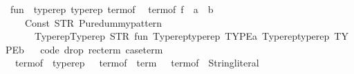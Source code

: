 \begin{isabellebody}
{\isafoldML}%
%
\isadelimML
%
\endisadelimML
%
\isadelimdocument
%
\endisadelimdocument
%
\isatagdocument
%
\isamarkuptrue%
%
\endisatagdocument
{\isafolddocument}%
%
\isadelimdocument
%
\endisadelimdocument
{}\isamarkupfalse%
\ {\isachardoublequoteopen}fun{\isachardoublequoteclose}\ {\isacharcolon}{\kern0pt}{\isacharcolon}{\kern0pt}\ {\isacharparenleft}{\kern0pt}typerep{\isacharcomma}{\kern0pt}\ typerep{\isacharparenright}{\kern0pt}\ term{\isacharunderscore}{\kern0pt}of\isanewline
{}\isanewline
\isanewline
{}\isamarkupfalse%
\isanewline
\ \ {\isachardoublequoteopen}term{\isacharunderscore}{\kern0pt}of\ {\isacharparenleft}{\kern0pt}f\ {\isacharcolon}{\kern0pt}{\isacharcolon}{\kern0pt}\ {\isacharprime}{\kern0pt}a\ {\isasymRightarrow}\ {\isacharprime}{\kern0pt}b{\isacharparenright}{\kern0pt}\ {\isacharequal}{\kern0pt}\isanewline
\ \ \ \ Const\ {\isacharparenleft}{\kern0pt}STR\ {\isacharprime}{\kern0pt}{\isacharprime}{\kern0pt}Pure{\isachardot}{\kern0pt}dummy{\isacharunderscore}{\kern0pt}pattern{\isacharprime}{\kern0pt}{\isacharprime}{\kern0pt}{\isacharparenright}{\kern0pt}\isanewline
\ \ \ \ \ \ {\isacharparenleft}{\kern0pt}Typerep{\isachardot}{\kern0pt}Typerep\ {\isacharparenleft}{\kern0pt}STR\ {\isacharprime}{\kern0pt}{\isacharprime}{\kern0pt}fun{\isacharprime}{\kern0pt}{\isacharprime}{\kern0pt}{\isacharparenright}{\kern0pt}\ {\isacharbrackleft}{\kern0pt}Typerep{\isachardot}{\kern0pt}typerep\ TYPE{\isacharparenleft}{\kern0pt}{\isacharprime}{\kern0pt}a{\isacharparenright}{\kern0pt}{\isacharcomma}{\kern0pt}\ Typerep{\isachardot}{\kern0pt}typerep\ TYPE{\isacharparenleft}{\kern0pt}{\isacharprime}{\kern0pt}b{\isacharparenright}{\kern0pt}{\isacharbrackright}{\kern0pt}{\isacharparenright}{\kern0pt}{\isachardoublequoteclose}\isanewline
\isanewline
{}\isamarkupfalse%
%
\isadelimproof
\ %
\endisadelimproof
%
\isatagproof
\isacommand{{\isachardot}{\kern0pt}{\isachardot}{\kern0pt}}\isamarkupfalse%
%
\endisatagproof
{\isafoldproof}%
%
\isadelimproof
%
\endisadelimproof
\isanewline
\isanewline
{}\isamarkupfalse%
\isanewline
\isanewline
{}\isamarkupfalse%
\ {\isacharbrackleft}{\kern0pt}{\isacharbrackleft}{\kern0pt}code\ drop{\isacharcolon}{\kern0pt}\ rec{\isacharunderscore}{\kern0pt}term\ case{\isacharunderscore}{\kern0pt}term\isanewline
\ \ {\isachardoublequoteopen}term{\isacharunderscore}{\kern0pt}of\ {\isacharcolon}{\kern0pt}{\isacharcolon}{\kern0pt}\ typerep\ {\isasymRightarrow}\ {\isacharunderscore}{\kern0pt}{\isachardoublequoteclose}\ {\isachardoublequoteopen}term{\isacharunderscore}{\kern0pt}of\ {\isacharcolon}{\kern0pt}{\isacharcolon}{\kern0pt}\ term\ {\isasymRightarrow}\ {\isacharunderscore}{\kern0pt}{\isachardoublequoteclose}\ {\isachardoublequoteopen}term{\isacharunderscore}{\kern0pt}of\ {\isacharcolon}{\kern0pt}{\isacharcolon}{\kern0pt}\ String{\isachardot}{\kern0pt}literal\ {\isasymRightarrow}\ {\isacharunderscore}{\kern0pt}{\isachardoublequoteclose}\isanewline

\end{isabellebody}
